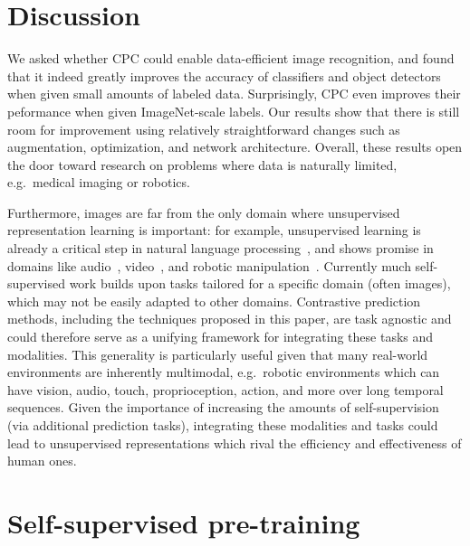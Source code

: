 \documentclass{article}
\begin{document}
\section{Discussion}

We asked whether CPC could enable data-efficient image recognition, and found that it indeed greatly improves the accuracy of classifiers and object detectors when given small amounts of labeled data.  Surprisingly, CPC even improves their peformance when given ImageNet-scale labels. Our results show that there is still room for improvement using relatively straightforward changes such as augmentation, optimization, and network architecture. Overall, these results open the door toward research on problems where data is naturally limited, e.g.\ medical imaging or robotics.

Furthermore, images are far from the only domain where unsupervised representation learning is important: for example, unsupervised learning is already a critical step in natural language processing~\citep{mikolov2013word2vec,devlin2018bert}, and shows promise in domains like audio~\citep{oord2018representation,arandjelovic2018objects,arandjelovic2017look}, video~\citep{jing2018self,misra2016shuffle}, and robotic manipulation~\citep{pinto2016supersizing,pinto2016supervision,sermanet2018time}.  
Currently much self-supervised work builds upon tasks tailored for a specific domain (often images), which may not be easily adapted to other domains.  Contrastive prediction methods, 
including the techniques proposed in this paper, are task agnostic and could therefore serve as a unifying framework for integrating these tasks and modalities. This generality is particularly useful given that many real-world environments are inherently multimodal, e.g.\ robotic environments which can have vision, audio, touch, proprioception, action, and more over long temporal sequences. Given the importance of increasing the amounts of self-supervision (via additional prediction tasks), integrating these modalities and tasks could lead to unsupervised representations which rival the efficiency and effectiveness of human ones. 




\clearpage
\appendix
{}
\section{Self-supervised pre-training}
\label{sec:appendix_pretrain}
\end{document}
